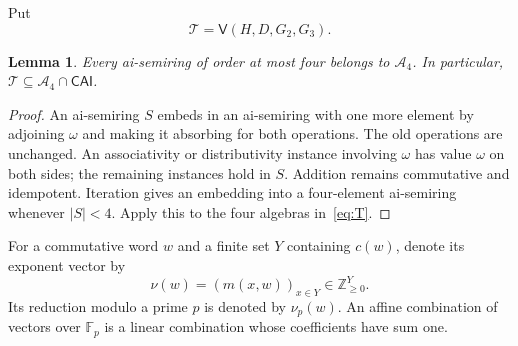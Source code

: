 \documentclass[10pt,a4paper]{amsart}
\newtheorem{lemma}[theorem]{Lemma}
\newcommand{\CAI}{\mathsf{CAI}}
\newcommand{\A}{\mathcal A_4}
\newcommand{\T}{\mathcal T}
\newcommand{\F}{\mathbb F}
\newcommand{\V}{\mathsf V}
\numberwithin{equation}{section}
\begin{document}
Put
\begin{equation}\label{eq:T}
\T=\V(H,D,G_2,G_3).
\end{equation}

\begin{lemma}\label{lem:inclusion}
Every ai-semiring of order at most four belongs to $\A$. In particular,
$\T\subseteq\A\cap\CAI$.
\end{lemma}
\begin{proof}
An ai-semiring $S$ embeds in an ai-semiring with one more element by
adjoining $\omega$ and making it absorbing for both operations. The old
operations are unchanged. An associativity or distributivity instance
involving $\omega$ has value $\omega$ on both sides; the remaining
instances hold in $S$. Addition remains commutative and idempotent.
Iteration gives an embedding into a four-element ai-semiring whenever
$|S|<4$. Apply this to the four algebras in~\eqref{eq:T}.
\end{proof}

For a commutative word $w$ and a finite set $Y$ containing $c(w)$, denote
its exponent vector by
\[
\nu(w)=(m(x,w))_{x\in Y}\in\mathbb Z_{\geq0}^{Y}.
\]
Its reduction modulo a prime $p$ is denoted by $\nu_p(w)$. An affine
combination of vectors over $\F_p$ is a linear combination whose
coefficients have sum one.
\end{document}
